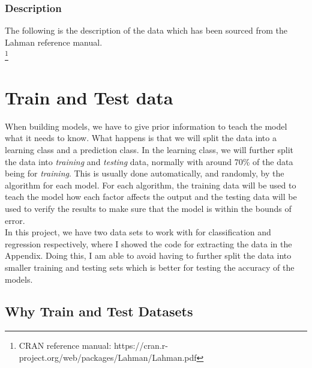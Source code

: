 \documentclass[11pt,a4paper]{report}
\begin{document}
\subsubsection{Description}
The following is the description of the data which has been sourced from the Lahman reference manual.\cite{Lahman}\\
\footnote{CRAN reference manual: https://cran.r-project.org/web/packages/Lahman/Lahman.pdf}



\section{Train and Test data}
When building models, we have to give prior information to teach the model what it needs to know.
What happens is that we will split the data into a learning class and a prediction class. 
In the learning class, we will further split the data into \textit{training} and \textit{testing} data, normally with around 70\% of the data being for \textit{training}. 
This is usually done automatically, and randomly, by the algorithm for each model.
For each algorithm, the training data will be used to teach the model how each factor affects the output and the testing data will be used to verify the results to make sure that the model is within the bounds of error.
\medskip\\
In this project, we have two data sets to work with for classification and regression respectively, where I showed the code for extracting the data in the Appendix.
Doing this, I am able to avoid having to further split the data into smaller training and testing sets which is better for testing the accuracy of the models.

\subsection{Why Train and Test Datasets}
\end{document}
